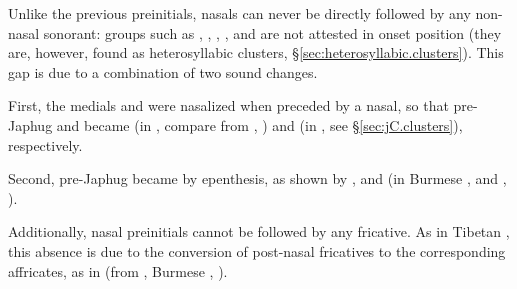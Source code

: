 Unlike the previous preinitials, nasals can never be directly followed by any non-nasal sonorant: groups such as , , , ,  and  are not attested in onset position (they are, however, found as heterosyllabic clusters, §\ref{sec:heterosyllabic.clusters}). This gap is due to a combination of two sound changes. 

First, the medials  and  were nasalized when preceded by a nasal, so that pre-Japhug  and  became  (in , compare  from , \citealt[18]{hill2019phonology}) and  (in , see §\ref{sec:jC.clusters}), respectively.  

Second, pre-Japhug  became  by epenthesis, as shown by ,  and  (in Burmese ,  and , \citealt[60;259]{hill2019phonology}).

Additionally, nasal preinitials cannot be followed by any fricative. As in Tibetan \citep{lifk33}, this absence is due to the conversion of post-nasal fricatives to the corresponding affricates, as in  (from , Burmese , \citealt[56]{hill2019phonology}).

